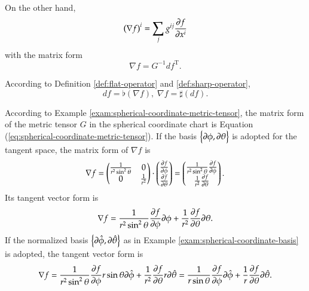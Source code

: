 \documentclass[11pt, a4paper]{book}
\begin{document}
On the other hand,
\begin{equation}
  \label{eq:df-to-gradient}
  \left( \nabla f \right)^i = \sum_j g^{ij} \frac{\partial f}{\partial x^{i}}
\end{equation}
with the matrix form
\begin{equation}
  \nabla f = G^{-1} df^{\mathrm{T}}.
\end{equation}

According to Definition \ref{def:flat-operator} and \ref{def:sharp-operator},
\begin{equation}
  df = \flat(\nabla f), \; \nabla f = \sharp(df).
\end{equation}

\begin{Example}
  According to Example \ref{exam:spherical-coordinate-metric-tensor}, the matrix form of
  the metric tensor $G$ in the spherical coordinate chart is Equation
  (\ref{eq:spherical-coordinate-metric-tensor}). If the basis
  $\left\{ \boldsymbol{\partial}\phi, \boldsymbol{\partial}\theta \right\}$ is adopted for the tangent space, the matrix form of
  $\nabla f$ is
  \begin{equation}
    \nabla f = \begin{pmatrix}
      \frac{1}{r^2\sin^2\theta} & 0 \\
      0 & \frac{1}{r^2}
    \end{pmatrix}
    \cdot
    \begin{pmatrix}
      \frac{\partial f}{\partial \phi} \\
      \frac{\partial f}{\partial \theta}
    \end{pmatrix} = \begin{pmatrix}
      \frac{1}{r^2\sin^2\theta} \frac{\partial f}{\partial \phi} \\
      \frac{1}{r^2} \frac{\partial f}{\partial \theta}
    \end{pmatrix}.
  \end{equation}
  Its tangent vector form is
  \begin{equation}
    \nabla f = \frac{1}{r^2\sin^2\theta} \frac{\partial f}{\partial \phi} \boldsymbol{\partial}\phi +
    \frac{1}{r^2} \frac{\partial f}{\partial \theta} \boldsymbol{\partial}\theta.
  \end{equation}
  If the normalized basis
  $\left\{ \boldsymbol{\partial}\hat{\phi}, \boldsymbol{\partial}\hat{\theta} \right\}$ as in Example
  \ref{exam:spherical-coordinate-basis} is adopted, the tangent vector form is
  \begin{equation}
    \nabla f = \frac{1}{r^2\sin^2\theta} \frac{\partial f}{\partial \phi} r\sin\theta \boldsymbol{\partial}\hat{\phi} +
    \frac{1}{r^2} \frac{\partial f}{\partial \theta} r \boldsymbol{\partial}\hat{\theta} =
    \frac{1}{r\sin\theta} \frac{\partial f}{\partial \phi} \boldsymbol{\partial}\hat{\phi} +
    \frac{1}{r} \frac{\partial f}{\partial \theta} \boldsymbol{\partial}\hat{\theta}.
  \end{equation}
\end{Example}
\end{document}
